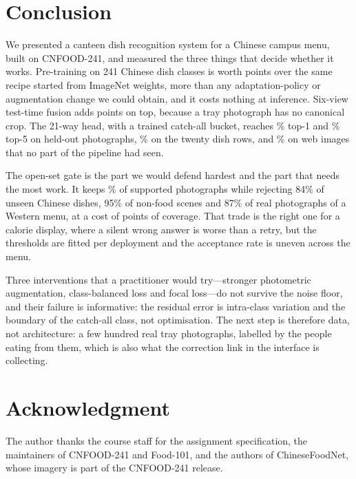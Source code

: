 \section{Conclusion}
We presented a canteen dish recognition system for a Chinese campus menu, built
on CNFOOD-241, and measured the three things that decide whether it works.
Pre-training on 241 Chinese dish classes is worth \cnGainPretrain{} points over
the same recipe started from ImageNet weights, more than any adaptation-policy or
augmentation change we could obtain, and it costs nothing at inference. Six-view
test-time fusion adds \cnFuseGain{} points on top, because a tray photograph has
no canonical crop. The 21-way head, with a trained catch-all bucket, reaches
\cnFuseTop\% top-1 and \cnFuseTopFive\% top-5 on \cnTestN{} held-out photographs,
\cnDishAcc\% on the twenty dish rows, and \webTop\% on \webN{} web images that no
part of the pipeline had seen.

The open-set gate is the part we would defend hardest and the part that needs the
most work. It keeps \gateIn\% of supported photographs while rejecting 84\% of
unseen Chinese dishes, 95\% of non-food scenes and 87\% of real photographs of a
Western menu, at a cost of \gateInCost{} points of coverage. That trade is the
right one for a calorie display, where a silent wrong answer is worse than a
retry, but the thresholds are fitted per deployment and the acceptance rate is
uneven across the menu.

Three interventions that a practitioner would try---stronger photometric
augmentation, class-balanced loss and focal loss---do not survive the noise floor,
and their failure is informative: the residual error is intra-class variation and
the boundary of the catch-all class, not optimisation. The next step is therefore
data, not architecture: a few hundred real tray photographs, labelled by the
people eating from them, which is also what the correction link in the interface
is collecting.

\section*{Acknowledgment}
The author thanks the course staff for the assignment specification, the
maintainers of CNFOOD-241 and Food-101, and the authors of ChineseFoodNet, whose
imagery is part of the CNFOOD-241 release.





